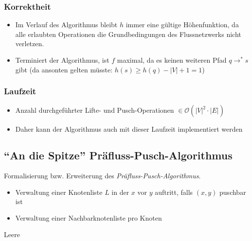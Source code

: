 \subsubsection{Korrektheit}
\begin{itemize}
	\item Im Verlauf des Algorithmus bleibt \(h\) immer eine gültige Höhenfunktion, da alle erlaubten Operationen die Grundbedingungen des Flussnetzwerks nicht verletzen.
	\item Terminiert der Algorithmus, ist \(f\) maximal, da es keinen weiteren Pfad \(q \rightarrow^* s\) gibt (da ansonten gelten müsste: \(h(s) \geq h(q)-|V|+1=1\))
\end{itemize}

\subsubsection{Laufzeit}
\begin{itemize}
	\item Anzahl durchgeführter Lifte- und Pusch-Operationen \(\in \mathcal{O}(|V|^2 \cdot |E|)\)
	\item Daher kann der Algorithmus auch mit dieser Laufzeit implementiert werden
\end{itemize}


\subsection{"`An die Spitze"' Präfluss-Pusch-Algorithmus}
Formalisierung bzw. Erweiterung des \textit{Präfluss-Pusch-Algorithmus}.
\begin{itemize}
	\item Verwaltung einer Knotenliste \(L\) in der \(x\) vor \(y\) auftritt, falls \((x,y)\) puschbar ist
	\item Verwaltung einer Nachbarknotenliste pro Knoten
\end{itemize}

\begin{algorithm}[H]
	\caption{Leere}

	\BlankLine

\end{algorithm}

